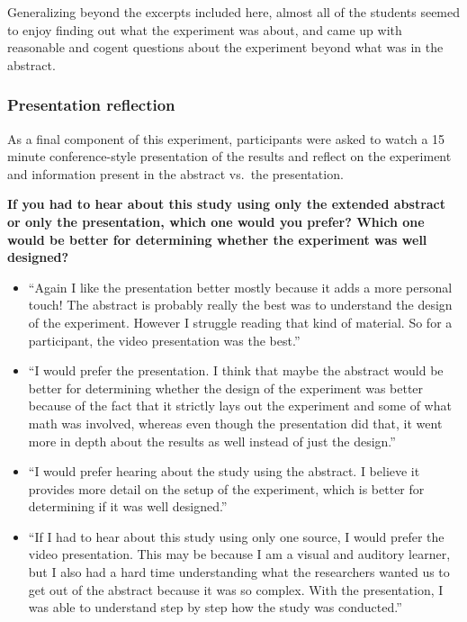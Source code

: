 \documentclass[runningheads
]{llncs}
\providecommand{\tightlist}{%
  \setlength{\itemsep}{0pt}\setlength{\parskip}{0pt}}\usepackage{longtable,booktabs,array}
\begin{document}
Generalizing beyond the excerpts included here, almost all of the
students seemed to enjoy finding out what the experiment was about, and
came up with reasonable and cogent questions about the experiment beyond
what was in the abstract.

\subsubsection{Presentation reflection}\label{presentation-reflection}

As a final component of this experiment, participants were asked to
watch a 15 minute conference-style presentation of the results and
reflect on the experiment and information present in the abstract
vs.~the presentation.

\textbf{If you had to hear about this study using only the extended
abstract or only the presentation, which one would you prefer? Which one
would be better for determining whether the experiment was well
designed?}

\begin{itemize}
\tightlist
\item
  ``Again I like the presentation better mostly because it adds a more
  personal touch! The abstract is probably really the best was to
  understand the design of the experiment. However I struggle reading
  that kind of material. So for a participant, the video presentation
  was the best.''
\item
  ``I would prefer the presentation. I think that maybe the abstract
  would be better for determining whether the design of the experiment
  was better because of the fact that it strictly lays out the
  experiment and some of what math was involved, whereas even though the
  presentation did that, it went more in depth about the results as well
  instead of just the design.''
\item
  ``I would prefer hearing about the study using the abstract. I believe
  it provides more detail on the setup of the experiment, which is
  better for determining if it was well designed.''
\item
  ``If I had to hear about this study using only one source, I would
  prefer the video presentation. This may be because I am a visual and
  auditory learner, but I also had a hard time understanding what the
  researchers wanted us to get out of the abstract because it was so
  complex. With the presentation, I was able to understand step by step
  how the study was conducted.''
\end{itemize}
\end{document}

